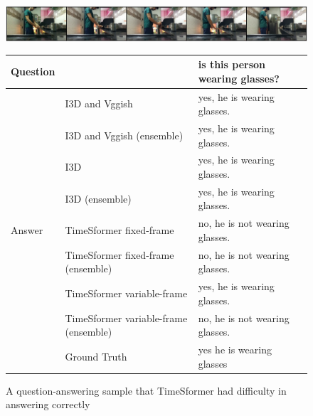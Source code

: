 \documentclass[letterpaper]{article} %
\begin{document}
\begin{figure}[t]
 \centering
 \includegraphics[width=\textwidth]{./fig/3UR3Y.png}
 \begin{tabular}{lll} \hline
  Question & & is this person wearing glasses? \\ \hline
  \multirow{9}{*}{Answer} & I3D and Vggish \cite{Li2021bridging} & yes, he is wearing glasses.\\
  & I3D and Vggish (ensemble) & yes, he is wearing glasses.\\
  & I3D & yes, he is wearing glasses.\\
  & I3D (ensemble) & yes, he is wearing glasses.\\
  & TimeSformer fixed-frame & no, he is not wearing glasses.\\
  & TimeSformer fixed-frame (ensemble) & no, he is not wearing glasses.\\
  & TimeSformer variable-frame & yes, he is wearing glasses.\\
  & TimeSformer variable-frame (ensemble) & no, he is not wearing glasses.\\
  & Ground Truth & yes he is wearing glasses \\ \hline
 \end{tabular}
 \caption{A question-answering sample that TimeSformer had difficulty in answering correctly}
 \label{fig:bad_sample}
\end{figure}
\end{document}
